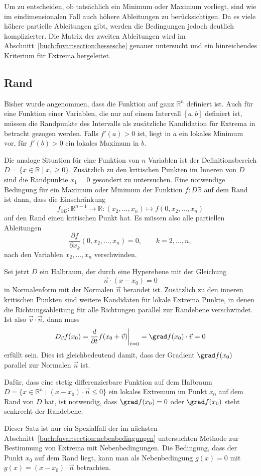 Um zu entscheiden, ob tatsächlich ein Minimum oder Maximum vorliegt,
sind wie im eindimensionalen Fall auch höhere Ableitungen zu berücksichtigen.
Da es viele höhere partielle Ableitungen gibt, werden die Bedingungen
jedoch deutlich komplizierter.
Die Matrix der zweiten Ableitungen wird im
Abschnitt~\ref{buch:fuvar:section:hessesche} genauer untersucht 
und ein hinreichendes Kriterium für Extrema hergeleitet.

%
%
\subsection{Rand}
Bisher wurde angenommen, dass die Funktion auf ganz $\mathbb{R}^n$
definiert ist.
Auch für eine Funktion einer Variablen, die nur auf einem Intervall
$[a,b]$ definiert ist, müssen die Randpunkte des Intervalls als
zusätzliche Kandidation für Extrema in betracht gezogen werden.
Falls $f'(a)>0$ ist, liegt in $a$ ein lokales Minimum vor, für
$f'(b)>0$ ein lokales Maximum in $b$.

Die analoge Situation für eine Funktion von $n$ Variablen ist der
Definitionsbereich $D=\{x\in \mathbb{R}\mid x_1\ge 0\}$.
Zusätzlich zu den kritischen Punkten im Inneren von $D$ sind die
Randpunkte $x_1=0$ gesondert zu untersuchen.
Eine notwendige Bedingung für ein Maximum oder Minimum der Funktion
$f\colon D\mathbb{R}$ auf dem Rand ist dann, dass die Einschränkung
\[
f_{\partial D}
\colon
\mathbb{R}^{n-1}\to \mathbb{R}
:
(x_2,\dots,x_n)\mapsto f(0,x_2,\dots,x_n)
\]
auf den Rand einen kritischen Punkt hat.
Es müssen also alle partiellen Ableitungen
\[
\frac{\partial f}{\partial x_k}(0,x_2,\dots,x_n)
=
0,\qquad k=2,\dots,n,
\]
nach den Variablen
$x_2,\dots,x_n$ verschwinden.

Sei jetzt $D$ ein Halbraum, der durch eine Hyperebene mit der Gleichung
\[
\vec{n}\cdot (x-x_0) = 0
\]
in Normalenform mit der Normalen $\vec{n}$ berandet ist.
Zusätzlich zu den inneren kritischen Punkten sind weitere Kandidaten
für lokale Extrema Punkte, in denen die Richtungsableitung für alle
Richtungen parallel zur Randebene verschwindet.
Ist also $\vec{v}\cdot \vec{n}$, dann muss
\[
D_{\vec{v}} f(x_0)
=
\frac{d}{\partial t}f(x_0+\vec{v})\bigg|_{t=0}
=
\grad f(x_0)\cdot \vec{v}
=
0
\]
erfüllt sein.
Dies ist gleichbedeutend damit, dass der Gradient $\grad f(x_0)$ parallel
zur Normalen $\vec{n}$ ist.

\begin{satz}
Dafür, dass eine stetig differenzierbare Funktion auf dem Halbraum
$D=\{x\in\mathbb{R}^n\mid (x-x_0)\cdot\vec{n}\le 0\}$ ein lokales 
Extremum im Punkt $x_0$ auf dem Rand von $D$ hat, ist notwendig,
dass $\grad f(x_0)=0$ oder $\grad f(x_0)$ steht senkrecht der Randebene.
\end{satz}

Dieser Satz ist nur ein Spezialfall der im nächsten
Abschnitt~\ref{buch:fuvar:section:nebenbedingungen}
untersuchten Methode zur Bestimmung von Extrema mit Nebenbedingungen.
Die Bedingung, dass der Punkt $x_0$ auf dem Rand liegt, kann man
als Nebenbedingung $g(x) = 0$ mit $g(x)=(x-x_0)\cdot\vec{n}$ betrachten.




